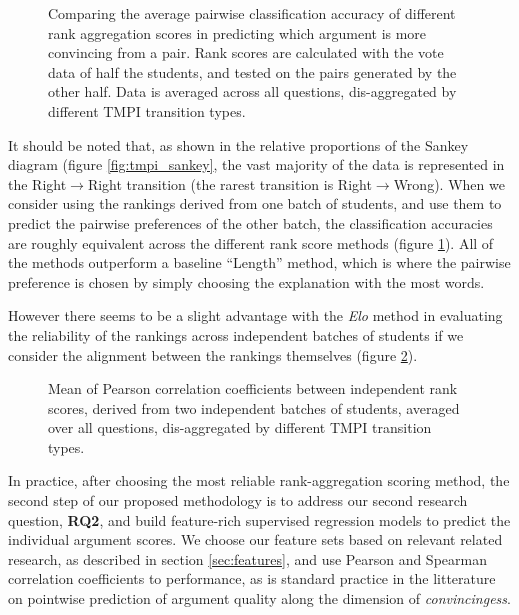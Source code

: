 \documentclass[notitlepage,12pt]{jedm}
\begin{document}
\begin{figure}[H]
	\centering
	\scalebox{0.6}{}
	\caption{
		Comparing the average pairwise classification accuracy of different 
		rank aggregation scores in predicting which argument is more convincing 
		from a pair. 
		Rank scores are calculated with the vote data of half the students, and 
		tested on the pairs generated by the other half. 
		Data is averaged across all questions, dis-aggregated by different TMPI 
		transition types. 
	}
	\label{fig:acc_by_batch}
\end{figure}

It should be noted that, as shown in the relative proportions of the Sankey 
diagram (figure \ref{fig:tmpi_sankey}, the vast majority of the data is 
represented in the Right$\rightarrow$Right transition (the rarest transition is 
Right$\rightarrow$Wrong).
When we consider using the rankings derived from one batch of students, and use 
them to predict the pairwise preferences of the other batch, the classification 
accuracies are roughly equivalent across the different rank score methods 
(figure \ref{fig:acc_by_batch}).
All of the methods outperform a baseline ``Length'' method, which is where the 
pairwise preference is chosen by simply choosing the explanation with the most 
words.

However there seems to be a slight advantage with the \textit{Elo} method in 
evaluating the reliability of the rankings across independent batches of 
students if we consider the alignment between the rankings themselves (figure 
\ref{fig:corr_by_batch}).


\begin{figure}[H]
	\centering
	\scalebox{0.6}{}
	\caption{
		Mean of Pearson correlation coefficients between independent rank 
		scores, derived from two independent batches of students, averaged over 
		all questions, dis-aggregated by different TMPI transition types.
	}
	\label{fig:corr_by_batch}
\end{figure}

In practice, after choosing the most reliable rank-aggregation scoring method, 
the second step of our proposed methodology is to address our second research 
question, \textbf{RQ2}, and build feature-rich supervised regression models to 
predict the individual argument scores.
We choose our feature sets based on relevant related research, as described in 
section \ref{sec:features}, and use Pearson and Spearman correlation 
coefficients to performance, as is standard practice in the litterature on 
pointwise prediction of argument quality along the dimension of 
\textit{convincingess}. 
 
\end{document}
